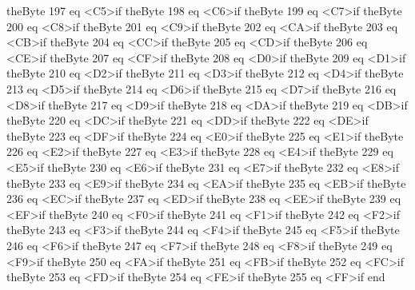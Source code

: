 {theByte 197 eq {<C5>}if
theByte 198 eq {<C6>}if
theByte 199 eq {<C7>}if
theByte 200 eq {<C8>}if
theByte 201 eq {<C9>}if
theByte 202 eq {<CA>}if
theByte 203 eq {<CB>}if
theByte 204 eq {<CC>}if
theByte 205 eq {<CD>}if
theByte 206 eq {<CE>}if
theByte 207 eq {<CF>}if
theByte 208 eq {<D0>}if
theByte 209 eq {<D1>}if
theByte 210 eq {<D2>}if
theByte 211 eq {<D3>}if
theByte 212 eq {<D4>}if
theByte 213 eq {<D5>}if
theByte 214 eq {<D6>}if
theByte 215 eq {<D7>}if
theByte 216 eq {<D8>}if
theByte 217 eq {<D9>}if
theByte 218 eq {<DA>}if
theByte 219 eq {<DB>}if
theByte 220 eq {<DC>}if
theByte 221 eq {<DD>}if
theByte 222 eq {<DE>}if
theByte 223 eq {<DF>}if
theByte 224 eq {<E0>}if
theByte 225 eq {<E1>}if
theByte 226 eq {<E2>}if
theByte 227 eq {<E3>}if
theByte 228 eq {<E4>}if
theByte 229 eq {<E5>}if
theByte 230 eq {<E6>}if
theByte 231 eq {<E7>}if
theByte 232 eq {<E8>}if
theByte 233 eq {<E9>}if
theByte 234 eq {<EA>}if
theByte 235 eq {<EB>}if
theByte 236 eq {<EC>}if
theByte 237 eq {<ED>}if
theByte 238 eq {<EE>}if
theByte 239 eq {<EF>}if
theByte 240 eq {<F0>}if
theByte 241 eq {<F1>}if
theByte 242 eq {<F2>}if
theByte 243 eq {<F3>}if
theByte 244 eq {<F4>}if
theByte 245 eq {<F5>}if
theByte 246 eq {<F6>}if
theByte 247 eq {<F7>}if
theByte 248 eq {<F8>}if
theByte 249 eq {<F9>}if
theByte 250 eq {<FA>}if
theByte 251 eq {<FB>}if
theByte 252 eq {<FC>}if
theByte 253 eq {<FD>}if
theByte 254 eq {<FE>}if
theByte 255 eq {<FF>}if
end\space
}

\newcommand{\fcColorToColorStringCode}{
5 dict begin
/theColor exch def
/theColor [theColor {cvi} forall] def
theColor 0 get
theColor 0 get 255 gt {pop 255}if
theColor 0 get 0 lt {pop 0}if
\fcByteToHexStringCode %
theColor 1 get
theColor 1 get 255 gt {pop 255}if
theColor 1 get 0 lt {pop 0}if
\fcByteToHexStringCode %
theColor 2 get
theColor 2 get 255 gt {pop 255}if
theColor 2 get 0 lt {pop 0} if
\fcByteToHexStringCode %
3 \fcConcatenateMultiple
end
}

\newcommand{\fcColorFromColorBaseAndPoint}{
5 dict begin
\fcScreen\space pop \fcVectorNormalize \fcVectorScalarVector
/theScalarProd exch def
/currentColor exch def
/theColorDifference
getZmax getZmin sub dup 0 eq {(Zmax equal Zmin, something is wrong!) == pop 1}if
theScalarProd getZmin sub exch div 0.5 sub \fcLightDifference\space mul
def
currentColor [theColorDifference theColorDifference theColorDifference] \fcVectorMinusVector
end\space
}

\newcommand{\fcShFillPlaneFromLightSourceGetColorFromXYCode}{
\fcGetPointOnPlaneThatProjectsToXYCode\space
currentColor exch
\fcColorFromColorBaseAndPoint \space 255 \fcVectorTimesScalar
\fcColorToColorStringCode\space
}



